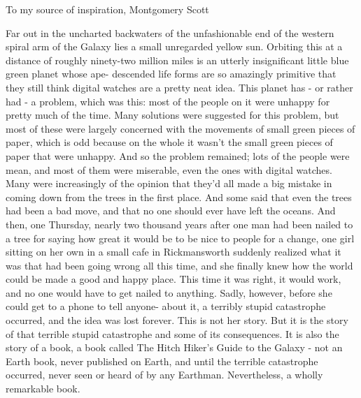 \documentclass[%
    corpo=11pt,
    twoside, %
    oldstyle,
    autoretitolo,
    greek,
    evenboxes,
   tipotesi = frontespizio,
]{toptesi}
\begin{document}
\english





\begin{dedica}
	To my source of inspiration, Montgomery Scott
	
\end{dedica}
\paginavuota
\sommario 

Far out in the uncharted backwaters of the unfashionable end of
the western spiral arm of the Galaxy lies a small unregarded
yellow sun.
Orbiting this at a distance of roughly ninety-two million miles is an utterly insignificant little blue green planet whose ape- descended life forms are so amazingly primitive that they still think digital watches are a pretty neat idea.
This planet has - or rather had - a problem, which was this: most of the people on it were unhappy for pretty much of the time.
Many solutions were suggested for this problem, but most of
these were largely concerned with the movements of small green
pieces of paper, which is odd because on the whole it wasn't the small green pieces of paper that were unhappy.
And so the problem remained; lots of the people were mean, and
most of them were miserable, even the ones with digital watches.
Many were increasingly of the opinion that they'd all made a big mistake in coming down from the trees in the first place. And some said that even the trees had been a bad move, and that no one should ever have left the oceans.
And then, one Thursday, nearly two thousand years after one
man had been nailed to a tree for saying how great it would be to be nice to people for a change, one girl sitting on her own in a small cafe in Rickmansworth suddenly realized what it was that had been going wrong all this time, and she finally knew how the world could be made a good and happy place. This time it was right, it would work, and no one would have to get nailed to anything.
Sadly, however, before she could get to a phone to tell anyone-
about it, a terribly stupid catastrophe occurred, and the idea was lost forever.
This is not her story.
But it is the story of that terrible stupid catastrophe and some of its consequences.
It is also the story of a book, a book called The Hitch Hiker's
Guide to the Galaxy - not an Earth book, never published on
Earth, and until the terrible catastrophe occurred, never seen or heard of by any Earthman.
Nevertheless, a wholly remarkable book.
\end{document}
